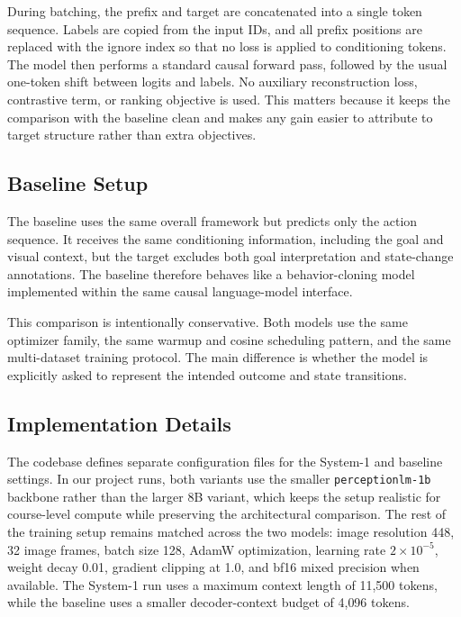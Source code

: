 \documentclass[11pt]{article}
\begin{document}
During batching, the prefix and target are concatenated into a single token sequence. Labels are copied from the input IDs, and all prefix positions are replaced with the ignore index so that no loss is applied to conditioning tokens. The model then performs a standard causal forward pass, followed by the usual one-token shift between logits and labels. No auxiliary reconstruction loss, contrastive term, or ranking objective is used. This matters because it keeps the comparison with the baseline clean and makes any gain easier to attribute to target structure rather than extra objectives.

\subsection{Baseline Setup}
The baseline uses the same overall framework but predicts only the action sequence. It receives the same conditioning information, including the goal and visual context, but the target excludes both goal interpretation and state-change annotations. The baseline therefore behaves like a behavior-cloning model implemented within the same causal language-model interface.

This comparison is intentionally conservative. Both models use the same optimizer family, the same warmup and cosine scheduling pattern, and the same multi-dataset training protocol. The main difference is whether the model is explicitly asked to represent the intended outcome and state transitions.

\subsection{Implementation Details}
The codebase defines separate configuration files for the System-1 and baseline settings. In our project runs, both variants use the smaller \texttt{perceptionlm-1b} backbone rather than the larger 8B variant, which keeps the setup realistic for course-level compute while preserving the architectural comparison. The rest of the training setup remains matched across the two models: image resolution 448, 32 image frames, batch size 128, AdamW optimization, learning rate $2\times10^{-5}$, weight decay 0.01, gradient clipping at 1.0, and bf16 mixed precision when available. The System-1 run uses a maximum context length of 11{,}500 tokens, while the baseline uses a smaller decoder-context budget of 4{,}096 tokens.
\end{document}
